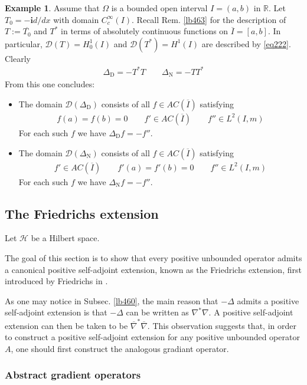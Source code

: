 \documentclass[12pt,b5paper,notitlepage]{article}
\theoremstyle{definition}
\newtheorem{eg}[df]{Example}
\theoremstyle{plain}
\newcommand{\ovl}{\overline}
\newcommand{\Dom}{\mathscr{D}}
\newcommand{\im}{\mathbf{i}}
\newcommand{\Rbb}{\mathbb R}
\newcommand{\MH}{\mathcal H}
\newcommand{\DD}{\Delta_{\mathrm D}}
\newcommand{\DN}{\Delta_{\mathrm N}}
\numberwithin{equation}{section}
\begin{document}
\begin{eg}
Assume that $\Omega$ is a bounded open interval $I=(a,b)$ in $\Rbb$. Let $T_0=-\im d/dx$ with domain $C_c^\infty(I)$. Recall Rem. \ref{lb463} for the description of $T:=\ovl {T_0}$ and $T^*$ in terms of absolutely continuous functions on $\ovl I=[a,b]$. In particular, $\Dom(T)=H_0^1(I)$ and $\Dom(T^*)=H^1(I)$ are described by \eqref{eq222}. Clearly
\begin{align*}
\DD=-T^*T\qquad \DN=-TT^*
\end{align*}
From this one concludes:
\begin{itemize}
\item The domain $\Dom(\DD)$ consists of all $f\in AC(\ovl I)$ satisfying
\begin{align*}
f(a)=f(b)=0\qquad f'\in AC(\ovl I)\qquad f''\in L^2(I,m)
\end{align*}
For each such $f$ we have $\DD f=-f''$.
\item The domain $\Dom(\DN)$ consists of all $f\in AC(\ovl I)$ satisfying
\begin{align*}
f'\in AC(\ovl I)\qquad f'(a)=f'(b)=0\qquad f''\in L^2(I,m)
\end{align*}
For each such $f$ we have $\DN f=-f''$.
\end{itemize}
\end{eg}



\subsection{The Friedrichs extension}\label{lb465}


Let $\MH$ be a Hilbert space.

The goal of this section is to show that every positive unbounded operator admits a canonical positive self-adjoint extension, known as the Friedrichs extension, first introduced by Friedrichs in \cite{Fri34a}. 

As one may notice in Subsec. \ref{lb460}, the main reason that $-\Delta$ admits a positive self-adjoint extension is that $-\Delta$ can be written as $\nabla^*\nabla$. A positive self-adjoint extension can then be taken to be $\ovl\nabla^*\ovl\nabla$. This observation suggests that, in order to construct a positive self-adjoint extension for any positive unbounded operator $A$, one should first construct the analogous gradiant operator.


\subsubsection{Abstract gradient operators}
\end{document}
